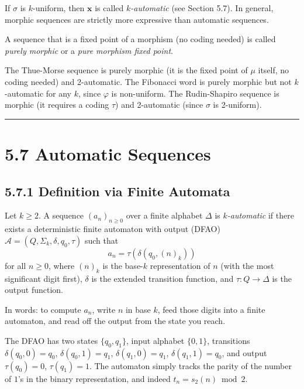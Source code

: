 If $\sigma$ is $k$-uniform, then $\mathbf{x}$ is called \textit{$k$-automatic} (see Section 5.7). In general, morphic sequences are strictly more expressive than automatic sequences.

A sequence that is a fixed point of a morphism (no coding needed) is called \textit{purely morphic} or a \textit{pure morphism fixed point}.

\begin{example}
The Thue-Morse sequence is purely morphic (it is the fixed point of $\mu$ itself, no coding needed) and 2-automatic. The Fibonacci word is purely morphic but not $k$-automatic for any $k$, since $\varphi$ is non-uniform. The Rudin-Shapiro sequence is morphic (it requires a coding $\tau$) and 2-automatic (since $\sigma$ is 2-uniform).

\bigskip\hrule\bigskip
\end{example}

\section{5.7 Automatic Sequences}

\subsection{5.7.1 Definition via Finite Automata}

\begin{definition}
Let $k \geq 2$. A sequence $(a_n)_{n \geq 0}$ over a finite alphabet $\Delta$ is \textit{$k$-automatic} if there exists a deterministic finite automaton with output (DFAO) $\mathcal{A} = (Q, \Sigma_k, \delta, q_0, \tau)$ such that
\[
a_n = \tau(\delta(q_0, (n)_k))
\]
for all $n \geq 0$, where $(n)_k$ is the base-$k$ representation of $n$ (with the most significant digit first), $\delta$ is the extended transition function, and $\tau: Q \to \Delta$ is the output function.

In words: to compute $a_n$, write $n$ in base $k$, feed those digits into a finite automaton, and read off the output from the state you reach.
\end{definition}

\begin{example}
The DFAO has two states $\{ q_0, q_1\} $, input alphabet $\{ 0,1\} $, transitions $\delta(q_0, 0) = q_0$, $\delta(q_0, 1) = q_1$, $\delta(q_1, 0) = q_1$, $\delta(q_1, 1) = q_0$, and output $\tau(q_0) = 0$, $\tau(q_1) = 1$. The automaton simply tracks the parity of the number of $1$'s in the binary representation, and indeed $t_n = s_2(n) \bmod 2$.
\end{example}

